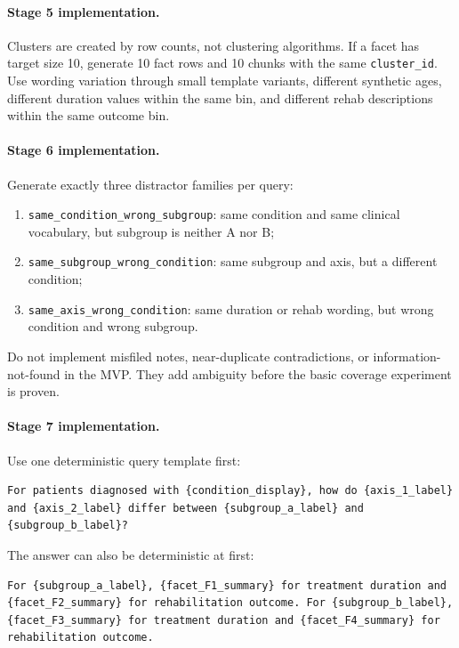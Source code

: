 \documentclass[11pt,a4paper]{article}
\newcommand{\field}[1]{\texttt{#1}}
\begin{document}
\paragraph{Stage 5 implementation.}
Clusters are created by row counts, not clustering algorithms. If a facet has target size 10, generate 10 fact rows and 10 chunks with the same \field{cluster\_id}. Use wording variation through small template variants, different synthetic ages, different duration values within the same bin, and different rehab descriptions within the same outcome bin.

\paragraph{Stage 6 implementation.}
Generate exactly three distractor families per query:

\begin{enumerate}[leftmargin=*]
	\item \field{same\_condition\_wrong\_subgroup}: same condition and same clinical vocabulary, but subgroup is neither A nor B;
	\item \field{same\_subgroup\_wrong\_condition}: same subgroup and axis, but a different condition;
	\item \field{same\_axis\_wrong\_condition}: same duration or rehab wording, but wrong condition and wrong subgroup.
\end{enumerate}

Do not implement misfiled notes, near-duplicate contradictions, or information-not-found in the MVP. They add ambiguity before the basic coverage experiment is proven.

\paragraph{Stage 7 implementation.}
Use one deterministic query template first:

\begin{lstlisting}[style=promptstyle]
For patients diagnosed with {condition_display}, how do {axis_1_label}
and {axis_2_label} differ between {subgroup_a_label} and {subgroup_b_label}?
\end{lstlisting}

The answer can also be deterministic at first:

\begin{lstlisting}[style=promptstyle]
For {subgroup_a_label}, {facet_F1_summary} for treatment duration and
{facet_F2_summary} for rehabilitation outcome. For {subgroup_b_label},
{facet_F3_summary} for treatment duration and {facet_F4_summary} for
rehabilitation outcome.
\end{lstlisting}
\end{document}
